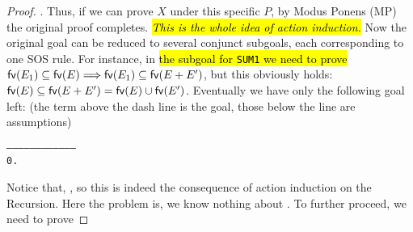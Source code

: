 \begin{proof}
. Thus, if we can prove
$X$ under this specific $P$, by Modus Ponens (MP) the original proof completes.
\hl{\emph{This is the whole idea of action induction.}}
Now the original goal can be reduced to several conjunct
subgoals, each corresponding to one SOS rule. For instance, in
\hl{the subgoal for \texttt{SUM1} we need to prove}
${{\rm\sf{fv}}}(E_1) \subseteq {{\rm\sf{fv}}}(E) \Longrightarrow
{{\rm\sf{fv}}}(E_1) \subseteq {{\rm\sf{fv}}}(E + E')$, but this obviously holds: ${{\rm\sf{fv}}}(E)
\subseteq {{\rm\sf{fv}}}(E + E') = {{\rm\sf{fv}}}(E) \cup {{\rm\sf{fv}}}(E')$. Eventually we have only
the following goal left: (the term above the dash line is the goal,
those below the line are assumptions)
\begin{alltt}
   ------------------------------------
    0.  
\end{alltt}
Notice that, , so
this is indeed the consequence of action induction on the Recursion.
Here the problem is, we know nothing about
. To further proceed, we need to prove

\end{proof}
